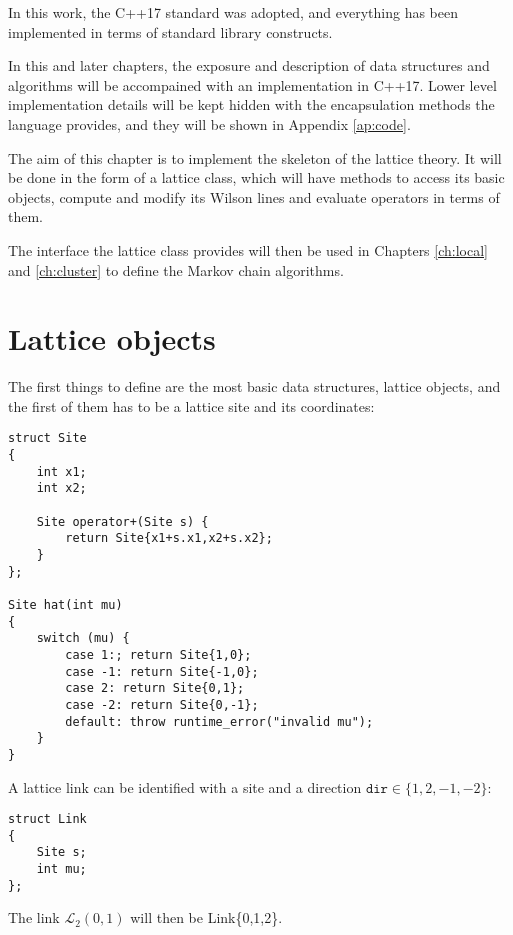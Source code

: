 In this work, the C++17 standard was adopted,
and everything has been implemented in terms of standard library constructs.

In this and later chapters, the exposure and description of data structures and algorithms will be accompained with an implementation in C++17.
Lower level implementation details will be kept hidden with the encapsulation methods the language provides,
and they will be shown in Appendix \ref{ap:code}.

The aim of this chapter is to implement the skeleton of the lattice theory.
It will be done in the form of a lattice class, which will have methods to access its basic objects,
compute and modify its Wilson lines and evaluate operators in terms of them.

The interface the lattice class provides will then be used in Chapters \ref{ch:local} and \ref{ch:cluster} to define the Markov chain algorithms.

\section{Lattice objects}

The first things to define are the most basic data structures, \ie lattice objects,
and the first of them has to be a lattice site and its coordinates:
\begin{lstlisting}[caption={Site type}]
struct Site
{
    int x1;
    int x2;

    Site operator+(Site s) {
        return Site{x1+s.x1,x2+s.x2};
    }
};

Site hat(int mu)
{
    switch (mu) {
        case 1:; return Site{1,0};
        case -1: return Site{-1,0};
        case 2: return Site{0,1};
        case -2: return Site{0,-1};
        default: throw runtime_error("invalid mu");
    }
}
\end{lstlisting}
A lattice link can be identified with a site and a direction $\texttt{dir} \in \{1,2,-1,-2\}$:
\begin{lstlisting}[caption={Link type}]
struct Link
{
    Site s;
    int mu;
};
\end{lstlisting}
The link $\mathcal L_2(0,1)$ will then be {\ttfamily Link\{0,1,2\}}.


